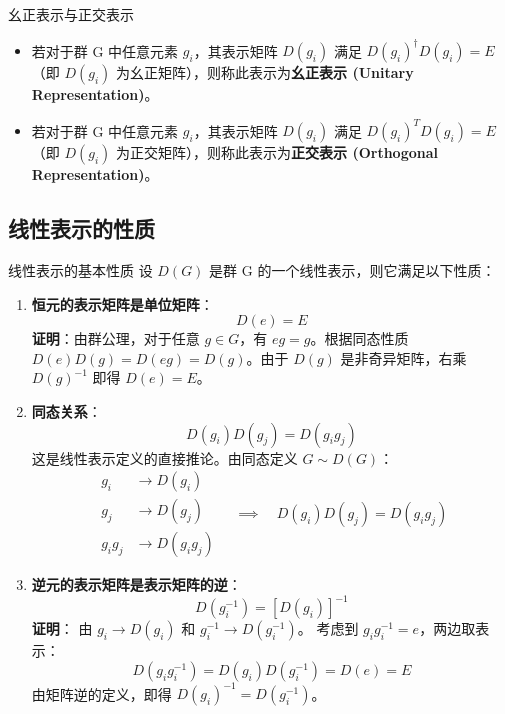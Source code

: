 \begin{definition}{幺正表示与正交表示}
    \begin{itemize}
        \item 若对于群 G 中任意元素 $g_i$，其表示矩阵 $D(g_i)$ 满足 $D(g_i)^\dagger D(g_i) = E$（即 $D(g_i)$ 为幺正矩阵），则称此表示为\textbf{幺正表示 (Unitary Representation)}。
        \item 若对于群 G 中任意元素 $g_i$，其表示矩阵 $D(g_i)$ 满足 $D(g_i)^T D(g_i) = E$（即 $D(g_i)$ 为正交矩阵），则称此表示为\textbf{正交表示 (Orthogonal Representation)}。
    \end{itemize}
\end{definition}

\subsection{线性表示的性质}
\begin{property}{线性表示的基本性质}
    设 $D(G)$ 是群 G 的一个线性表示，则它满足以下性质：
    \begin{enumerate}
        \item \textbf{恒元的表示矩阵是单位矩阵}：
        \begin{equation}
            D(e) = E
        \end{equation}
        \textbf{证明}：由群公理，对于任意 $g \in G$，有 $eg = g$。根据同态性质 $D(e)D(g) = D(eg) = D(g)$。由于 $D(g)$ 是非奇异矩阵，右乘 $D(g)^{-1}$ 即得 $D(e) = E$。
        
        \item \textbf{同态关系}：
        \begin{equation}
            D(g_i)D(g_j) = D(g_i g_j)
        \end{equation}
        这是线性表示定义的直接推论。由同态定义 $G \sim D(G)$：
        \begin{equation}
            \begin{aligned}
                g_i &\to D(g_i) \\
                g_j &\to D(g_j) \\
                g_i g_j &\to D(g_i g_j)
            \end{aligned}
            \quad \implies \quad D(g_i)D(g_j) = D(g_i g_j)
        \end{equation}
        
        \item \textbf{逆元的表示矩阵是表示矩阵的逆}：
        \begin{equation}
            D(g_i^{-1}) = [D(g_i)]^{-1}
        \end{equation}
        \textbf{证明}：
        由 $g_i \to D(g_i)$ 和 $g_i^{-1} \to D(g_i^{-1})$。
        考虑到 $g_i g_i^{-1} = e$，两边取表示：
        \begin{equation}
            D(g_i g_i^{-1}) = D(g_i)D(g_i^{-1}) = D(e) = E
        \end{equation}
        由矩阵逆的定义，即得 $D(g_i)^{-1} = D(g_i^{-1})$。
    \end{enumerate}
\end{property}

